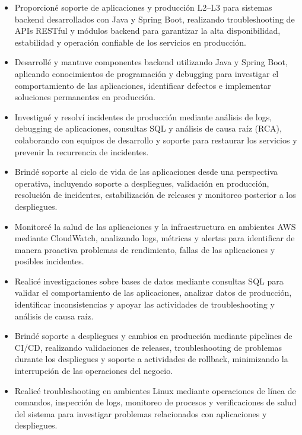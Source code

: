 \documentclass[10pt,letterpaper]{article}
\begin{document}
\begin{itemize}

\item Proporcioné soporte de aplicaciones y producción L2--L3 para sistemas backend desarrollados con Java y Spring Boot, realizando troubleshooting de APIs RESTful y módulos backend para garantizar la alta disponibilidad, estabilidad y operación confiable de los servicios en producción.

\item Desarrollé y mantuve componentes backend utilizando Java y Spring Boot, aplicando conocimientos de programación y debugging para investigar el comportamiento de las aplicaciones, identificar defectos e implementar soluciones permanentes en producción.

\item Investigué y resolví incidentes de producción mediante análisis de logs, debugging de aplicaciones, consultas SQL y análisis de causa raíz (RCA), colaborando con equipos de desarrollo y soporte para restaurar los servicios y prevenir la recurrencia de incidentes.

\item Brindé soporte al ciclo de vida de las aplicaciones desde una perspectiva operativa, incluyendo soporte a despliegues, validación en producción, resolución de incidentes, estabilización de releases y monitoreo posterior a los despliegues.

\item Monitoreé la salud de las aplicaciones y la infraestructura en ambientes AWS mediante CloudWatch, analizando logs, métricas y alertas para identificar de manera proactiva problemas de rendimiento, fallas de las aplicaciones y posibles incidentes.

\item Realicé investigaciones sobre bases de datos mediante consultas SQL para validar el comportamiento de las aplicaciones, analizar datos de producción, identificar inconsistencias y apoyar las actividades de troubleshooting y análisis de causa raíz.

\item Brindé soporte a despliegues y cambios en producción mediante pipelines de CI/CD, realizando validaciones de releases, troubleshooting de problemas durante los despliegues y soporte a actividades de rollback, minimizando la interrupción de las operaciones del negocio.

\item Realicé troubleshooting en ambientes Linux mediante operaciones de línea de comandos, inspección de logs, monitoreo de procesos y verificaciones de salud del sistema para investigar problemas relacionados con aplicaciones y despliegues.


\end{itemize}
\end{document}
